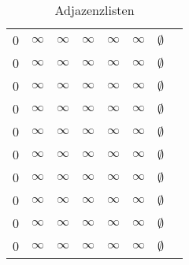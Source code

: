 \documentclass{scrartcl}
\begin{document}
\begin{table}[h]
\begin{tabular}{c|ccccccc}
          0       & $\infty$ & $\infty$ & $\infty$ & $\infty$ & $\infty$ & $\emptyset$ \\
          0       & $\infty$ & $\infty$ & $\infty$ & $\infty$ & $\infty$ & $\emptyset$ \\
          0       & $\infty$ & $\infty$ & $\infty$ & $\infty$ & $\infty$ & $\emptyset$ \\
          0       & $\infty$ & $\infty$ & $\infty$ & $\infty$ & $\infty$ & $\emptyset$ \\
          0       & $\infty$ & $\infty$ & $\infty$ & $\infty$ & $\infty$ & $\emptyset$ \\
          0       & $\infty$ & $\infty$ & $\infty$ & $\infty$ & $\infty$ & $\emptyset$ \\
          0       & $\infty$ & $\infty$ & $\infty$ & $\infty$ & $\infty$ & $\emptyset$ \\
          0       & $\infty$ & $\infty$ & $\infty$ & $\infty$ & $\infty$ & $\emptyset$ \\
          0       & $\infty$ & $\infty$ & $\infty$ & $\infty$ & $\infty$ & $\emptyset$ \\
          0       & $\infty$ & $\infty$ & $\infty$ & $\infty$ & $\infty$ & $\emptyset$ \\
        \end{tabular}
  \caption{Adjazenzlisten}
  \label{tab:alg}
\end{table}
\end{document}
